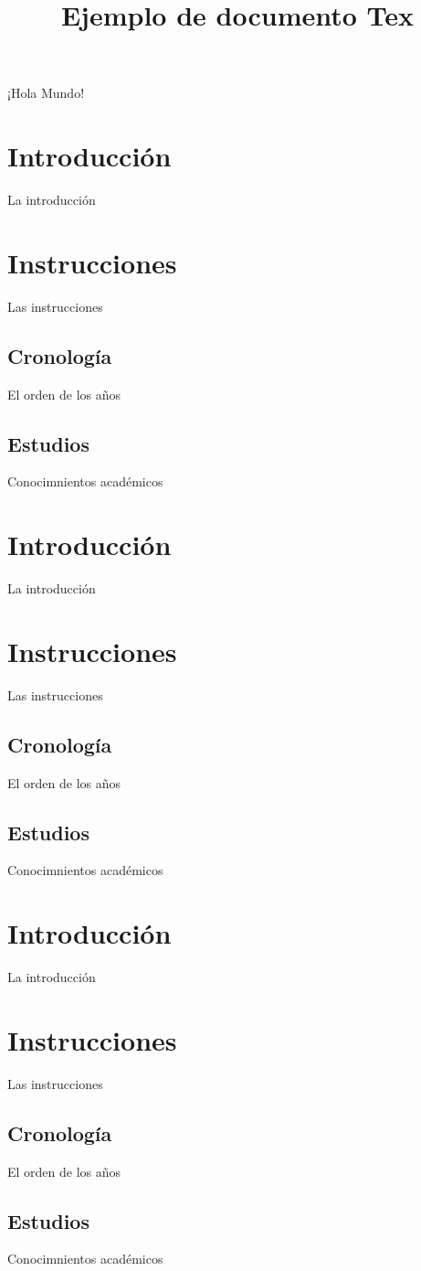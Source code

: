 \documentclass[30pt,a4paper]{article}
\title{Ejemplo de documento Tex}
\begin{document}
  \maketitle
  ¡Hola Mundo! 
  \section{Introducción}
    La introducción
  \section{Instrucciones}
    Las instrucciones
    \subsection{Cronología}
      El orden de los años
    \subsection{Estudios}
      Conocimnientos académicos
  \section{Introducción}
    La introducción
  \section{Instrucciones}
    Las instrucciones
    \subsection{Cronología}
      El orden de los años
    \subsection{Estudios}
      Conocimnientos académicos\\
  \section{Introducción}
    La introducción
  \section{Instrucciones}
    Las instrucciones
    \subsection{Cronología}
      El orden de los años
    \subsection{Estudios}
      Conocimnientos académicos 
\end{document}

